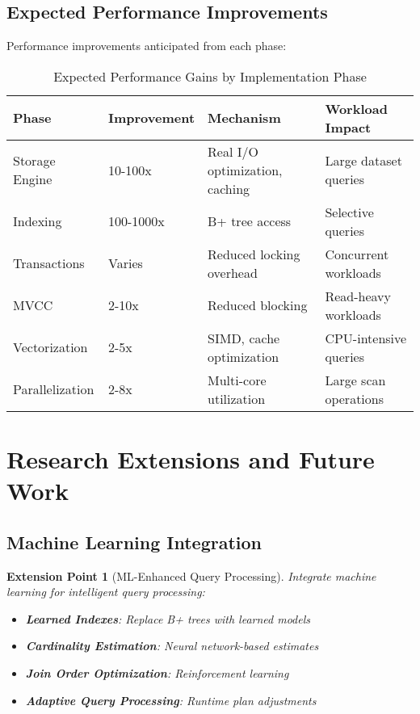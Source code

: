\documentclass[12pt,a4paper]{article}
\newtheorem{extension}{Extension Point}[section]
\begin{document}
    \subsection{Expected Performance Improvements}

    Performance improvements anticipated from each phase:

    \begin{table}[htbp]
        \centering
        \caption{Expected Performance Gains by Implementation Phase}
        \label{tab:performance_gains}
        \begin{tabular}{lp{3cm}p{3cm}p{4cm}}
            \toprule
            \textbf{Phase} & \textbf{Improvement} & \textbf{Mechanism} & \textbf{Workload Impact} \\
            \midrule
            Storage Engine & 10-100x & Real I/O optimization, caching & Large dataset queries \\
            Indexing & 100-1000x & B+ tree access & Selective queries \\
            Transactions & Varies & Reduced locking overhead & Concurrent workloads \\
            MVCC & 2-10x & Reduced blocking & Read-heavy workloads \\
            Vectorization & 2-5x & SIMD, cache optimization & CPU-intensive queries \\
            Parallelization & 2-8x & Multi-core utilization & Large scan operations \\
            \bottomrule
        \end{tabular}
    \end{table}

    \section{Research Extensions and Future Work}

    \subsection{Machine Learning Integration}

    \begin{extension}[ML-Enhanced Query Processing]
        Integrate machine learning for intelligent query processing:

        \begin{itemize}
            \item \textbf{Learned Indexes}: Replace B+ trees with learned models
            \item \textbf{Cardinality Estimation}: Neural network-based estimates
            \item \textbf{Join Order Optimization}: Reinforcement learning
            \item \textbf{Adaptive Query Processing}: Runtime plan adjustments
        \end{itemize}
    \end{extension}
\end{document}
